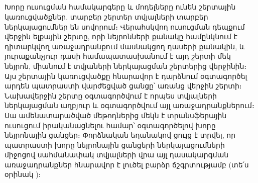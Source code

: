 \documentclass[12pt]{article}
\begin{document}
\begin{center}
\subsection*{
 } 
 \end{center}
 \noindent
{}
{}

Խորը ուսուցման համակարգերը և մոդելները ունեն շերտային կառուցվածքներ. տարբեր շերտեր տվյալների տարբեր ներկայացումներ են սովորում։ Վերահսկվող ուսուցման դեպքում վերջին ելքային շերտը, որի նեյրոնների քանակը համընկնում  է  դիտարկվող առաջադրանքում մասնակցող դասերի քանակին, և յուրաքանչյուր դասի համապատասխանում է այդ շերտի մեկ նեյրոն,   միանում է տվյաների ներկայացման շերտերից վերջինին։ Այս շերտային կառուցվածքը հնարավոր է դարձնում օգտագործել արդեն պատրաստի վարժեցված ցանցը՝ առանց վերջին շերտի։ Նախավերջին շերտը օգտագործվում է որպես տվյալների ներկայացման աղբյուր և օգտագործվում այլ առաջադրանքներում։  Սա ամենատարածված մեթոդներից մեկն է տրանսֆերային ուսուցում իրականացնելու համար՝ օգտագործելով խորը նեյրոնային ցանցեր։ Փորձնական եղանակով ցույց է տրվել, որ պատրաստի խորը նեյրոնային ցանցերի ներկայացումների միջոցով սահմանափակ տվյալների վրա այլ դասակարգման առաջադրանքներ հնարավոր է լուծել բարձր ճշգրտությամբ (տե՛ս օրինակ \cite{bib_item_8})։ \\
\end{document}
